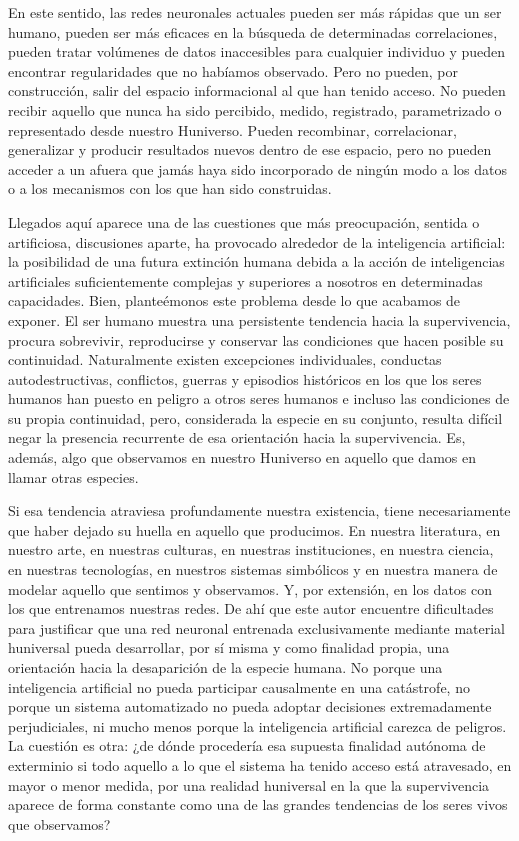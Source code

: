 \documentclass[12pt,a4paper]{article}
\begin{document}
En este sentido, las redes neuronales actuales pueden ser más rápidas que un ser humano, pueden ser más eficaces en la búsqueda de determinadas correlaciones, pueden tratar volúmenes de datos inaccesibles para cualquier individuo y pueden encontrar regularidades que no habíamos observado. Pero no pueden, por construcción, salir del espacio informacional al que han tenido acceso. No pueden recibir aquello que nunca ha sido percibido, medido, registrado, parametrizado o representado desde nuestro Huniverso. Pueden recombinar, correlacionar, generalizar y producir resultados nuevos dentro de ese espacio, pero no pueden acceder a un afuera que jamás haya sido incorporado de ningún modo a los datos o a los mecanismos con los que han sido construidas.

Llegados aquí aparece una de las cuestiones que más preocupación, sentida o artificiosa, discusiones aparte, ha provocado alrededor de la inteligencia artificial: la posibilidad de una futura extinción humana debida a la acción de inteligencias artificiales suficientemente complejas y superiores a nosotros en determinadas capacidades. Bien, planteémonos este problema desde lo que acabamos de exponer. El ser humano muestra una persistente tendencia hacia la supervivencia, procura sobrevivir, reproducirse y conservar las condiciones que hacen posible su continuidad. Naturalmente existen excepciones individuales, conductas autodestructivas, conflictos, guerras y episodios históricos en los que los seres humanos han puesto en peligro a otros seres humanos e incluso las condiciones de su propia continuidad, pero, considerada la especie en su conjunto, resulta difícil negar la presencia recurrente de esa orientación hacia la supervivencia. Es, además, algo que observamos en nuestro Huniverso en aquello que damos en llamar otras especies.

Si esa tendencia atraviesa profundamente nuestra existencia, tiene necesariamente que haber dejado su huella en aquello que producimos. En nuestra literatura, en nuestro arte, en nuestras culturas, en nuestras instituciones, en nuestra ciencia, en nuestras tecnologías, en nuestros sistemas simbólicos y en nuestra manera de modelar aquello que sentimos y observamos. Y, por extensión, en los datos con los que entrenamos nuestras redes. De ahí que este autor encuentre dificultades para justificar que una red neuronal entrenada exclusivamente mediante material huniversal pueda desarrollar, por sí misma y como finalidad propia, una orientación hacia la desaparición de la especie humana. No porque una inteligencia artificial no pueda participar causalmente en una catástrofe, no porque un sistema automatizado no pueda adoptar decisiones extremadamente perjudiciales, ni mucho menos porque la inteligencia artificial carezca de peligros. La cuestión es otra: ¿de dónde procedería esa supuesta finalidad autónoma de exterminio si todo aquello a lo que el sistema ha tenido acceso está atravesado, en mayor o menor medida, por una realidad huniversal en la que la supervivencia aparece de forma constante como una de las grandes tendencias de los seres vivos que observamos?
\end{document}
